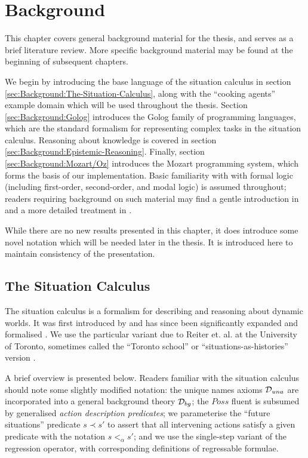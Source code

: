 

\chapter{Background}

\label{ch:background}

This chapter covers general background material for the thesis, and
serves as a brief literature review. More specific background material
may be found at the beginning of subsequent chapters.

We begin by introducing the base language of the situation calculus
in section \ref{sec:Background:The-Situation-Calculus}, along with
the {}``cooking agents'' example domain which will be used throughout
the thesis. Section \ref{sec:Background:Golog} introduces the Golog
family of programming languages, which are the standard formalism
for representing complex tasks in the situation calculus. Reasoning
about knowledge is covered in section \ref{sec:Background:Epistemic-Reasoning}.
Finally, section \ref{sec:Background:Mozart/Oz} introduces the Mozart
programming system, which forms the basis of our implementation. Basic
familiarity with with formal logic (including first-order, second-order,
and modal logic) is assumed throughout; readers requiring background
on such material may find a gentle introduction in \citep{kelly96logic}
and a more detailed treatment in \citep{fitting96fol_book,blakcburn02modal_logic}.

While there are no new results presented in this chapter, it does
introduce some novel notation which will be needed later in the thesis.
It is introduced here to maintain consistency of the presentation.


\section{The Situation Calculus\label{sec:Background:The-Situation-Calculus}}

The situation calculus is a formalism for describing and reasoning
about dynamic worlds. It was first introduced by \citet{McCHay69sitcalc}
and has since been significantly expanded and formalised \citep{reiter91frameprob,pirri99contributions_sitcalc}.
We use the particular variant due to Reiter et. al. at the University
of Toronto, sometimes called the {}``Toronto school'' or {}``situations-as-histories''
version \citep{levesque98sc_foundations,pirri99contributions_sitcalc}.

A brief overview is presented below. Readers familiar with the situation
calculus should note some slightly modified notation: the unique names
axioms $\mathcal{D}_{una}$ are incorporated into a general background theory
$\mathcal{D}_{bg}$; the $Poss$ fluent is subsumed by generalised \emph{action
description predicates}; we parameterise the {}``future situations''
predicate $s\prec s'$ to assert that all intervening actions satisfy
a given predicate with the notation $s<_{\alpha}s'$; and we use the
single-step variant of the regression operator, with corresponding
definitions of regressable formulae.


